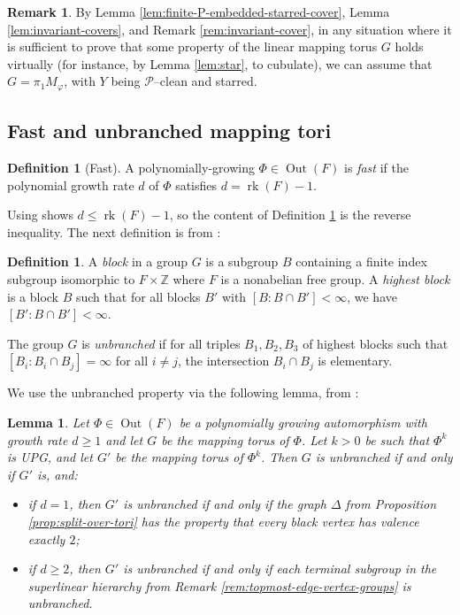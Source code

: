 \documentclass[11pt,oneside]{amsart}
\newtheorem{lem}[thm]{Lemma}
\theoremstyle{definition}
\newtheorem{defn}[thm]{Definition}
\newtheorem{rem}[thm]{Remark}
\DeclareMathOperator{\rank}{rk}
\DeclareMathOperator{\Out}{Out}
\newcommand{\field}[1]{\mathbb{#1}}
\newcommand{\integers}{\ensuremath{\field{Z}}}
\begin{document}
\begin{rem}\label{rem:assume-P-embedded}
By Lemma \ref{lem:finite-P-embedded-starred-cover}, Lemma \ref{lem:invariant-covers}, and Remark \ref{rem:invariant-cover}, in any situation where it is sufficient to prove that some property of the linear mapping torus $G$ holds virtually (for instance, by Lemma \ref{lem:star}, to cubulate), we can assume that $G=\pi_1M_\varphi$, with $Y$ being $\mathcal P$--clean  and starred. 
\end{rem}


\subsection{Fast and unbranched mapping tori}\label{subection:unbranched}

\begin{defn}[Fast]\label{defn:fast}
A polynomially-growing $\Phi\in\Out(F)$  is \emph{fast} if the polynomial growth rate $d$ of $\Phi$ satisfies $d=\rank(F)-1$.
\end{defn}

Using \cite[Lem. 2.16]{Macura:detour} shows $d\leq \rank(F)-1$, so the content of Definition \ref{defn:fast} is the reverse inequality. The next definition is from \cite{BGGH}:

\begin{defn}\label{defn:unbranched}
A \emph{block} in a group $G$ is a subgroup $B$ containing a finite index subgroup isomorphic to $F\times \integers$ where $F$ is a nonabelian free group.  A \emph{highest block} is a block $B$ such that for all blocks $B'$ with $[B:B\cap B']<\infty$, we have $[B':B\cap B']<\infty$. 

The group $G$ is \emph{unbranched} if for all triples $B_1,B_2,B_3$ of highest blocks such that $[B_i:B_i\cap B_j]=\infty$ for all $i\neq j$, the intersection $B_i\cap B_j$ is elementary.
\end{defn}

We use the unbranched property via the following lemma, from \cite{BGGH}:

\begin{lem}\label{lem:unbranched-char}
Let $\Phi\in\Out(F)$ be a polynomially growing automorphism with growth rate $d\geq 1$ and let $G$ be the mapping torus of $\Phi$.  Let $k>0$ be such that $\Phi^k$ is UPG, and let $G'$ be the mapping torus of $\Phi^k$.  Then $G$ is unbranched if and only if $G'$ is, and:
\begin{itemize}
    \item if $d=1$, then $G'$ is unbranched if and only if the graph $\Delta$ from Proposition \ref{prop:split-over-tori} has the property that every black vertex has valence exactly $2$;

    \item  if $d\geq 2$, then $G'$ is unbranched if and only if each terminal subgroup in the superlinear hierarchy from Remark \ref{rem:topmost-edge-vertex-groups} is unbranched.
\end{itemize}
\end{lem}
\end{document}
